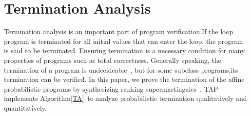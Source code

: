 \documentclass[sigconf,review, anonymous]{acmart}
\begin{document}
\section{Termination Analysis}
Termination analysis is an important part of program verification.If the loop program is terminated for all initial values that can enter the loop, the program is said to be terminated.  Ensuring termination is a necessary condition for many properties of programs such as total correctness. Generally speaking, the termination of a program is undecideable~\cite{Turing1936On}, but for some subclass programs,its termination can be verified. In this paper, we prove the termination of the affine probabilistic programs by synthesizing ranking supermartingales~\cite{Chakarov2013Martingales}. TAP implements Algorithm\ref{TA}~\cite{cha2015algorithmic,kris2016termination}to analyze probabilistic termination qualitatively and quantitatively. 
\end{document}
